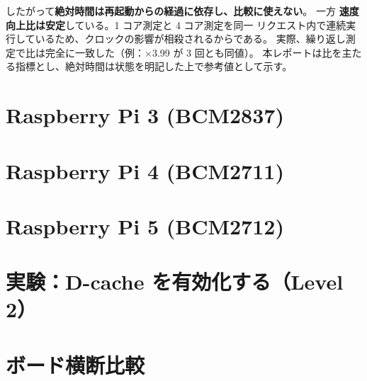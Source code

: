 \documentclass[11pt,a4paper]{article}
\newcommand{\spd}[1]{$\times$#1}
\begin{document}
したがって\textbf{絶対時間は再起動からの経過に依存し、比較に使えない}。
一方 \textbf{速度向上比は安定}している。1 コア測定と 4 コア測定を同一
リクエスト内で連続実行しているため、クロックの影響が相殺されるからである。
実際、繰り返し測定で比は完全に一致した（例：\spd{3.99} が 3 回とも同値）。
本レポートは比を主たる指標とし、絶対時間は状態を明記した上で参考値として示す。

\section{Raspberry Pi 3 (BCM2837)}
\label{sec:rpi3}


\section{Raspberry Pi 4 (BCM2711)}
\label{sec:rpi4}


\section{Raspberry Pi 5 (BCM2712)}
\label{sec:rpi5}


\section{実験：D-cache を有効化する（Level 2）}
\label{sec:dcache}


\section{ボード横断比較}
\label{sec:cross}
\end{document}
